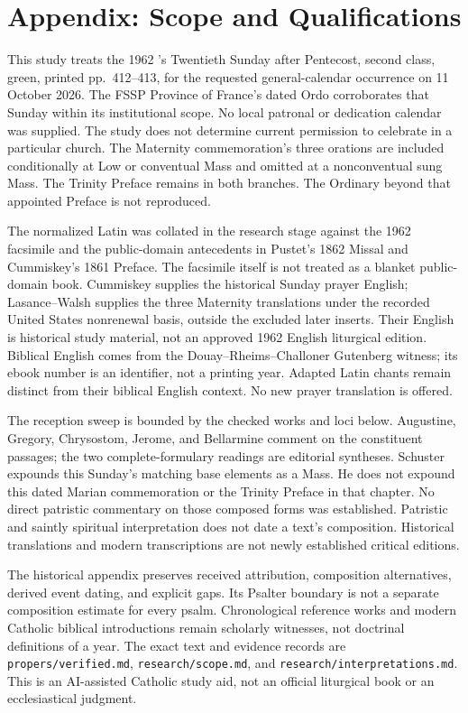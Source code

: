 \section{Appendix: Scope and Qualifications}

This study treats the 1962 's Twentieth Sunday after
Pentecost, second class, green, printed pp.~412--413, for the requested
general-calendar occurrence on 11 October 2026. The FSSP Province of
France's dated Ordo corroborates that Sunday within its institutional
scope. No local patronal or dedication calendar was supplied. The study
does not determine current permission to celebrate in a particular church.
The Maternity commemoration's three orations are included conditionally
at Low or conventual Mass and omitted at a nonconventual sung Mass. The
Trinity Preface remains in both branches. The Ordinary beyond that
appointed Preface is not reproduced.

The normalized Latin was collated in the research stage against the 1962
facsimile and the public-domain antecedents in Pustet's 1862 Missal and
Cummiskey's 1861 Preface. The facsimile itself is not treated as a
blanket public-domain book. Cummiskey supplies the historical Sunday
prayer English; Lasance--Walsh supplies the three Maternity translations
under the recorded United States nonrenewal basis, outside the excluded
later inserts. Their English is historical study material, not an
approved 1962 English liturgical edition. Biblical English comes from
the Douay--Rheims--Challoner Gutenberg witness; its ebook number is an
identifier, not a printing year. Adapted Latin chants remain distinct
from their biblical English context. No new prayer translation is offered.

The reception sweep is bounded by the checked works and loci below.
Augustine, Gregory, Chrysostom, Jerome, and Bellarmine comment on the
constituent passages; the two complete-formulary readings are editorial
syntheses. Schuster expounds this Sunday's matching base elements as a
Mass. He does not expound this dated Marian commemoration or the Trinity
Preface in that chapter. No direct patristic commentary on those composed
forms was established. Patristic and saintly spiritual interpretation
does not date a text's composition. Historical translations and modern
transcriptions are not newly established critical editions.

The historical appendix preserves received attribution, composition
alternatives, derived event dating, and explicit gaps. Its Psalter
boundary is not a separate composition estimate for every psalm.
Chronological reference works and modern Catholic biblical introductions
remain scholarly witnesses, not doctrinal definitions of a year.
The exact text and evidence records are \texttt{propers/verified.md},
\texttt{research/scope.md}, and \texttt{research/interpretations.md}.
This is an AI-assisted Catholic study aid, not an official liturgical
book or an ecclesiastical judgment.

